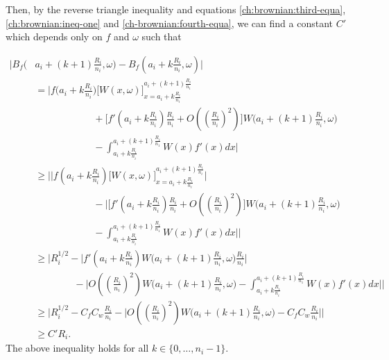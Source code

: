 	Then, by the reverse triangle inequality and equations \eqref{ch:brownian:third-equa}, \eqref{ch:brownian:ineq-one} and \eqref{ch-brownian:fourth-equa}, we can find a constant $C'$ which depends only on $f$ and $\omega$ such that
	
	
	\begin{align}\label{ch:brownian:main-equa}
	    \bigg\vert B_f\bigg(&a_i+(k+1)\frac{R_i}{n_i},\omega\bigg)-B_f\left(a_i+k\frac{R_i}{n_i},\omega\right)\bigg\vert \nonumber \\
	    &= \bigg\vert f\bigg(a_i+k\frac{R_i}{n_i}\bigg)\bigg[W(x,\omega)\bigg]_{x=a_i+k\frac{R_i}{n_i}}^{a_i+(k+1)\frac{R_i}{n_i}} \nonumber \\
	    & \qquad \qquad \qquad+ \bigg[f'\left(a_i + k \frac{R_i}{n_i}\right)\frac{R_i}{n_i} + O\left(\left(\frac{R_i}{n_i}\right)^2\right)\bigg]W\bigg(a_i+(k+1)\frac{R_i}{n_i},\omega\bigg) \nonumber \\
	    &\qquad \qquad \qquad- \int_{a_i+k \frac{R_i}{n_i}}^{a_i+(k+1)\frac{R_i}{n_1}}W(x)f'(x)dx \bigg\vert  \nonumber\\
	    &\ge \Bigg\vert \bigg\vert f\left(a_i + k \frac{R_i}{n_i}\right) \bigg[W(x,\omega) \bigg]_{x=a_i+k\frac{R_i}{n_i}}^{a_i+(k+1)\frac{R_i}{n_i}} \bigg\vert \nonumber\\
	    &\qquad \qquad \qquad - \bigg\vert \bigg[f'\left(a_i + k \frac{R_i}{n_i}\right)\frac{R_i}{n_i} + O\left(\left(\frac{R_i}{n_i}\right)^2\right)\bigg]W\bigg(a_i+(k+1)\frac{R_i}{n_i},\omega\bigg) \nonumber\\ 
	    &\qquad \qquad \qquad- \int_{a_i+k \frac{R_i}{n_i}}^{a_i+(k+1)\frac{R_i}{n_1}}W(x)f'(x)dx \bigg\vert \Bigg\vert  \nonumber \\
	    &\ge \Bigg\vert R_{i}^{1/2} - \bigg\vert f'\left(a_i + k \frac{R_i}{n_i}\right)W\bigg(a_i+(k+1)\frac{R_i}{n_i},\omega\bigg)\frac{R_i}{n_i} \bigg\vert \nonumber \\
	    &\qquad \qquad - \bigg\vert O\left(\left(\frac{R_i}{n_i}\right)^2\right) W\bigg(a_i+(k+1)\frac{R_i}{n_i},\omega\bigg) - \int_{a_i+k \frac{R_i}{n_i}}^{a_i+(k+1)\frac{R_i}{n_1}}W(x)f'(x)dx \bigg\vert \Bigg\vert  \nonumber \\
	    &\ge \Bigg\vert R_{i}^{1/2} - C_f C_w \frac{R_i}{n_i} - \bigg\vert O\left(\left(\frac{R_i}{n_i}\right)^2\right) W\bigg(a_i+(k+1)\frac{R_i}{n_i},\omega\bigg) - C_f C_w \frac{R_i}{n_i}\bigg\vert \Bigg\vert  \nonumber \\
	    & \ge C'R_i. 
	\end{align}
	The above inequality holds for all $k\in\{0,\dots,n_i-1\}$. 
	
